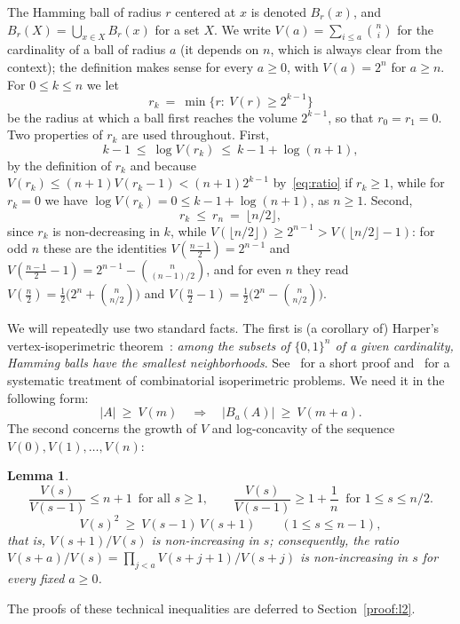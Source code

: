 \documentclass[11pt,a4paper]{article}
\newtheorem{lemma}[theorem]{Lemma}
\theoremstyle{definition}
\renewcommand{\le}{\leqslant}
\renewcommand{\ge}{\geqslant}
\begin{document}
The Hamming ball of radius $r$ centered at $x$ is denoted $B_r(x)$, and
$B_r(X)=\bigcup_{x\in X}B_r(x)$ for a set $X$. We write
$V(a)=\sum_{i\le a}\binom ni$ for the cardinality of a ball of radius $a$ (it
depends on $n$, which is always clear from the context); the definition makes
sense for every $a\ge0$, with $V(a)=2^n$ for $a\ge n$. For $0\le k\le n$ we let
\[
  r_k\ =\ \min\{r:\ V(r)\ge2^{k-1}\}
\]
be the radius at which a ball first reaches the volume $2^{k-1}$,
so that %
$r_0=r_1=0$. Two properties of $r_k$ are used
throughout. First,
\begin{equation}\label{eq:rk}
  k-1\ \le\ \log V(r_k)\ \le\ k-1+\log(n+1),
\end{equation}
by the definition of $r_k$ and because
$V(r_k)\le(n+1)V(r_k-1)<(n+1)2^{k-1}$ by~\eqref{eq:ratio} if $r_k\ge1$, while
for $r_k=0$ we have $\log V(r_k)=0\le k-1+\log(n+1)$, as $n\ge1$. Second,
\begin{equation}\label{eq:rkhalf}
  r_k\ \le\ r_n\ =\ \lfloor n/2\rfloor, %
\end{equation}
since $r_k$ is non-decreasing in $k$, while
$V(\lfloor n/2\rfloor)\ge2^{n-1}>V(\lfloor n/2\rfloor-1)$: for odd $n$ these
are the identities $V(\frac{n-1}2)=2^{n-1}$ and
$V(\frac{n-1}2-1)=2^{n-1}-\binom n{(n-1)/2}$, and for even $n$ they read
$V(\frac n2)=\frac12\bigl(2^n+\binom n{n/2}\bigr)$ and
$V(\frac n2-1)=\frac12\bigl(2^n-\binom n{n/2}\bigr)$.

We will repeatedly use two standard facts. The first is (a corollary of)
Harper's vertex-isoperimetric theorem~\cite{Harper66}: \emph{among the subsets
of $\{0,1\}^n$ of a given cardinality, Hamming balls have the smallest
neighborhoods}. See~\cite{FF81} for a short proof and~\cite{Harper04} for a
systematic treatment of combinatorial isoperimetric problems. We need it in the
following form:
\begin{equation}\label{eq:harper}
  |A|\ \ge\ V(m)\quad\Longrightarrow\quad |B_a(A)|\ \ge\ V(m+a).
\end{equation}
The second concerns the growth of $V$ and  log-concavity of the sequence $V(0),V(1),\dots,V(n)$:
\begin{lemma}\label{l:growth}
\begin{equation}\label{eq:ratio}
  \frac{V(s)}{V(s-1)}\le n+1\, \text{ for all }s\ge1,
  \qquad
  \frac{V(s)}{V(s-1)}\ge1+\frac1n\ \text{ for }1\le s\le n/2 .
\end{equation}
\begin{equation}\label{eq:logconc}
  V(s)^2\ \ge\ V(s-1)\,V(s+1)\qquad(1\le s\le n-1),
\end{equation}
that is, $V(s+1)/V(s)$ is non-increasing in $s$; consequently, the ratio
$V(s+a)/V(s)=\prod_{j<a}V(s+j+1)/V(s+j)$ is non-increasing in $s$ for every
fixed $a\ge0$. 
\end{lemma}
The proofs of these technical inequalities are deferred to Section~\ref{proof:l2}.
\end{document}
